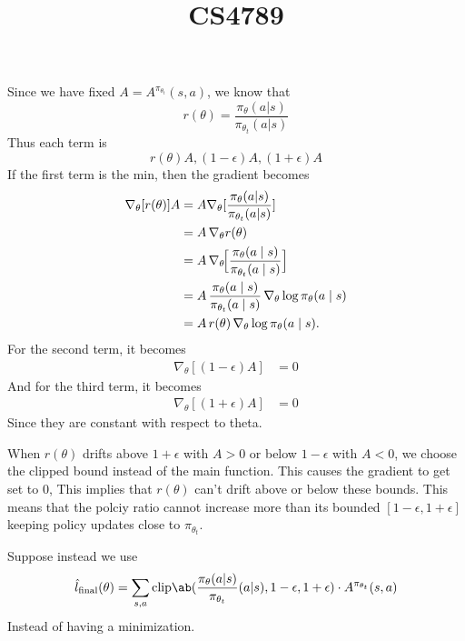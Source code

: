 \documentclass[12pt]{amsart}
\title{CS4789}
\begin{document}
  \maketitle
  \begin{problem}
    \begin{subproblem}
      Since we have fixed $A=A^{\pi_{\theta_t}}(s,a)$, we know that
      \[r(\theta)=\frac{\pi_\theta(a|s)}{\pi_{\theta_t}(a|s)}\]
      Thus each term is 
      \[r(\theta)A, (1-\epsilon)A, (1+\epsilon)A\]
      If the first term is the min, then the gradient becomes
      \begin{align*}
        \nabla_\theta[r(\theta)]A&=A\nabla_\theta[\frac{\pi_\theta(a|s)}{\pi_{\theta_t}(a|s)}] \\
                                 &= A\,\nabla_\theta r(\theta) \\
                                 &= A\,\nabla_\theta\!\Bigl[\frac{\pi_\theta(a\mid s)}{\pi_{\theta_t}(a\mid s)}\Bigr] \\
                                 &= A\,\frac{\pi_\theta(a\mid s)}{\pi_{\theta_t}(a\mid s)}\,\nabla_\theta\log\pi_\theta(a\mid s) \\
                                 &= A\,r(\theta)\,\nabla_\theta\log\pi_\theta(a\mid s).
      \end{align*}
      For the second term, it becomes
      \begin{align*}
        \nabla_\theta[(1-\epsilon)A] &= 0
      \end{align*}
      And for the third term, it becomes
      \begin{align*}
        \nabla_\theta[(1+\epsilon)A] &= 0
      \end{align*}
      Since they are constant with respect to theta.
    \end{subproblem}
    \begin{subproblem}
      When $r(\theta)$ drifts above $1+\epsilon$ with $A>0$ or below $1-\epsilon$ with $A<0$, we choose the clipped bound instead of the main function. This causes the gradient to get set to 0, This implies that $r(\theta)$ can't drift above or below these bounds. This means that the polciy ratio cannot increase more than its bounded $[1-\epsilon, 1+\epsilon]$ keeping policy updates close to $\pi_{\theta_t}$.
    \end{subproblem}
    \begin{subproblem}
      Suppose instead we use
      \[\hat l_{\text{final}}(\theta)=\sum_{s,a}\text{clip}\ab(\frac{\pi_\theta(a|s)}{\pi_{\theta_t}}(a|s), 1-\epsilon, 1+\epsilon)\cdot A^{\pi_{\theta_t}}(s,a)\]
      Instead of having a minimization. 


\end{subproblem}
\end{problem}
\end{document}
